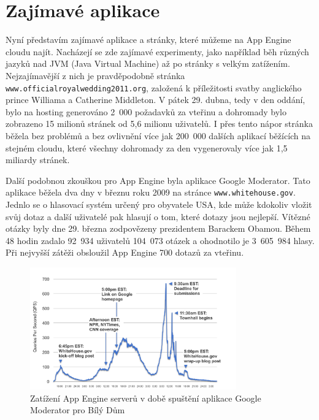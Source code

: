 \section{Zajímavé aplikace}
Nyní představím zajímavé aplikace a stránky, které můžeme na App Engine cloudu najít. Nacházejí se zde zajímavé experimenty, jako například běh různých jazyků nad JVM (Java Virtual Machine) až po stránky s velkým zatížením. Nejzajímavější z nich je pravděpodobně stránka \verb|www.officialroyalwedding2011.org|, založená k příležitosti svatby anglického prince Williama a Catherine Middleton. V pátek 29. dubna, tedy v den oddání, bylo na hosting generováno 2~000 požadavků za vteřinu a dohromady bylo zobrazeno 15 milionů stránek od 5,6 milionu uživatelů. I přes tento nápor stránka běžela bez problémů a bez ovlivnění více jak 200~000 dalších aplikací běžících na stejném cloudu, které všechny dohromady za den vygenerovaly více jak 1,5 miliardy stránek. \cite{royal-wedding}

Další podobnou zkouškou pro App Engine byla aplikace Google Moderator. Tato aplikace běžela dva dny v březnu roku 2009 na stránce \verb|www.whitehouse.gov|. Jednlo se o hlasovací systém určený pro obyvatele USA, kde může kdokoliv vložit svůj dotaz a další uživatelé pak hlasují o tom, které dotazy jsou nejlepší. Vítězné otázky byly dne 29. března zodpovězeny prezidentem Barackem Obamou. Během 48 hodin zadalo 92~934 uživatelů 104~073 otázek a ohodnotilo je 3~605~984 hlasy. Při nejvyšší zátěži obsloužil App Engine 700 dotazů za vteřinu. \cite{whitehouse-app}

\begin{figure}[h]
\begin{center}
\includegraphics[width=3.5in]{figures/townhallgraphic.png}
\caption{Zatížení App Engine serverů v době spuštění aplikace Google Moderator pro Bílý Dům \cite{whitehouse-app}}
\label{fig:whitehouse-app-picutre}
\end{center}
\end{figure}

